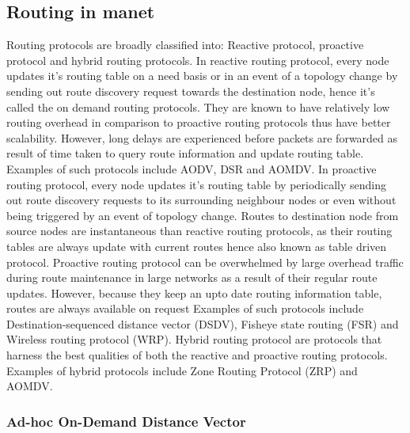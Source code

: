 \documentclass[letterpaper, 10 pt, conference]{ieeeconf}  %
\begin{document}
\subsection{Routing in manet}
Routing protocols are broadly classified into: Reactive protocol, proactive protocol and hybrid routing protocols. In reactive routing protocol, every node updates it's routing table on a need basis or in an event of a topology change by sending out route discovery request towards the destination node, hence it's called the on demand routing protocols. They are known to have relatively low routing overhead in comparison to proactive routing protocols thus have better scalability. However, long delays are experienced before packets are forwarded as result of time taken to query route information and update routing table. Examples of such protocols include AODV, DSR and AOMDV. In proactive routing protocol, every node updates it's routing table by periodically sending out route discovery requests to its surrounding neighbour nodes or even without being triggered by an event of topology change. Routes to destination node from source nodes are instantaneous than reactive routing protocols, as their routing tables are always update with current routes hence also known as table driven protocol. Proactive routing protocol can be overwhelmed by large overhead traffic during route maintenance in large networks as a result of their regular route updates. However, because they keep an upto date routing information table, routes are always available on request Examples of such protocols include Destination-sequenced distance vector (DSDV)\cite{Perkins1994HighlyComputers}, Fisheye state routing (FSR)\cite{GuangyuPeiFisheyeNetworks} and  Wireless routing protocol (WRP)\cite{Murthy1995ANetworks}. Hybrid routing protocol are protocols that harness the best qualities of both the reactive and proactive routing protocols. Examples of hybrid protocols include Zone Routing Protocol (ZRP) \cite{Haas2002TheNetworks} and AOMDV.
 
 


\subsubsection{Ad-hoc On-Demand Distance Vector}
\end{document}
